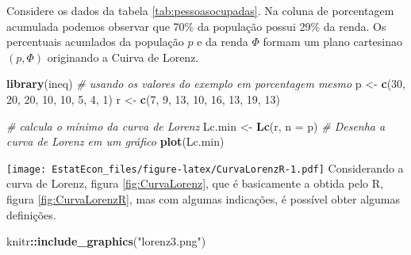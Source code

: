 \documentclass[
]{book}
\newenvironment{Shaded}{\begin{snugshade}}{\end{snugshade}}
\newcommand{\CommentTok}[1]{\textcolor[rgb]{0.56,0.35,0.01}{\textit{#1}}}
\newcommand{\DataTypeTok}[1]{\textcolor[rgb]{0.13,0.29,0.53}{#1}}
\newcommand{\DecValTok}[1]{\textcolor[rgb]{0.00,0.00,0.81}{#1}}
\newcommand{\KeywordTok}[1]{\textcolor[rgb]{0.13,0.29,0.53}{\textbf{#1}}}
\newcommand{\NormalTok}[1]{#1}
\newcommand{\OperatorTok}[1]{\textcolor[rgb]{0.81,0.36,0.00}{\textbf{#1}}}
\newcommand{\StringTok}[1]{\textcolor[rgb]{0.31,0.60,0.02}{#1}}
\begin{document}
Considere os dados da tabela \ref{tab:pessoasocupadas}. Na coluna de porcentagem acumulada podemos observar que 70\% da população possui 29\% da renda. Os percentuais acumlados da população \(p\) e da renda \(\Phi\) formam um plano cartesinao \((p,\Phi)\) originando a Cuirva de Lorenz.

\begin{Shaded}
\begin{Highlighting}[]
\KeywordTok{library}\NormalTok{(ineq)}
\CommentTok{# usando os valores do exemplo em porcentagem mesmo}
\NormalTok{p <-}\StringTok{ }\KeywordTok{c}\NormalTok{(}\DecValTok{30}\NormalTok{, }\DecValTok{20}\NormalTok{, }\DecValTok{20}\NormalTok{, }\DecValTok{10}\NormalTok{, }\DecValTok{10}\NormalTok{, }\DecValTok{5}\NormalTok{, }\DecValTok{4}\NormalTok{, }\DecValTok{1}\NormalTok{)}
\NormalTok{r <-}\StringTok{ }\KeywordTok{c}\NormalTok{(}\DecValTok{7}\NormalTok{, }\DecValTok{9}\NormalTok{, }\DecValTok{13}\NormalTok{, }\DecValTok{10}\NormalTok{, }\DecValTok{16}\NormalTok{, }\DecValTok{13}\NormalTok{, }\DecValTok{19}\NormalTok{, }\DecValTok{13}\NormalTok{)}

\CommentTok{# calcula o mínimo da curva de Lorenz}
\NormalTok{Lc.min <-}\StringTok{ }\KeywordTok{Lc}\NormalTok{(r, }\DataTypeTok{n =}\NormalTok{ p)}
\CommentTok{# Desenha a curva de Lorenz em um gráfico}
\KeywordTok{plot}\NormalTok{(Lc.min)}
\end{Highlighting}
\end{Shaded}

\texttt{[image: EstatEcon\_files/figure-latex/CurvaLorenzR-1.pdf]}
Considerando a curva de Lorenz, figura \ref{fig:CurvaLorenz}, que é basicamente a obtida pelo R, figura \ref{fig:CurvaLorenzR}, mas com algumas indicações, é possível obter algumas definições.

\begin{Shaded}
\begin{Highlighting}[]
\NormalTok{knitr}\OperatorTok{::}\KeywordTok{include_graphics}\NormalTok{(}\StringTok{"lorenz3.png"}\NormalTok{)}
\end{Highlighting}
\end{Shaded}
\end{document}
